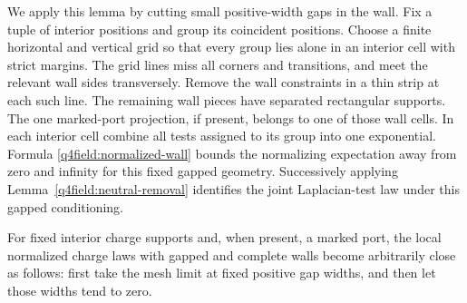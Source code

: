 We apply this lemma by cutting small positive-width gaps in the wall.
Fix a tuple of interior positions and group its coincident positions.
Choose a finite horizontal and vertical grid so that every group
lies alone in an interior cell with strict margins.  The grid lines
miss all corners and transitions, and meet the relevant wall sides
transversely.  Remove the wall constraints in a thin strip at each
such line.  The remaining wall pieces have separated rectangular
supports.  The one marked-port projection, if present, belongs to
one of those wall cells.  In each interior cell combine all tests
assigned to its group into one exponential.  Formula
\eqref{q4field:normalized-wall} bounds the normalizing expectation
away from zero and infinity for this fixed gapped geometry.
Successively applying Lemma~\ref{q4field:neutral-removal} identifies
the joint Laplacian-test law under this gapped conditioning.

\begin{lemma}\label{q4field:close-gaps}
For fixed interior charge supports and, when present, a marked port,
the local normalized charge laws with gapped and complete walls
become arbitrarily close as follows: first take the mesh limit at
fixed positive gap widths, and then let those widths tend to zero.
\end{lemma}

